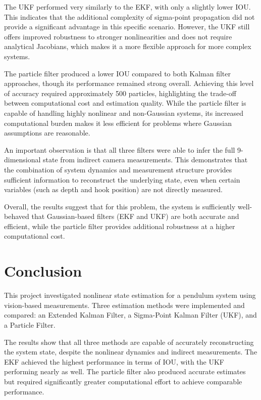 \documentclass[11pt, letterpaper, twocolumn]{article}
\begin{document}
The UKF performed very similarly to the EKF, with only a slightly lower IOU. This indicates
that the additional complexity of sigma-point propagation did not provide a significant advantage
in this specific scenario. However, the UKF still offers improved robustness to stronger nonlinearities
and does not require analytical Jacobians, which makes it a more flexible approach for more complex systems.

The particle filter produced a lower IOU compared to both Kalman filter approaches, though its 
performance remained strong overall. Achieving this level of accuracy required approximately 500 
particles, highlighting the trade-off between computational cost and estimation quality. While the 
particle filter is capable of handling highly nonlinear and non-Gaussian systems, its increased 
computational burden makes it less efficient for problems where Gaussian assumptions are reasonable.

An important observation is that all three filters were able to infer the full 9-dimensional state 
from indirect camera measurements. This demonstrates that the combination of system dynamics and 
measurement structure provides sufficient information to reconstruct the underlying state, even when 
certain variables (such as depth and hook position) are not directly measured.

Overall, the results suggest that for this problem, the system is sufficiently well-behaved that 
Gaussian-based filters (EKF and UKF) are both accurate and efficient, while the particle filter 
provides additional robustness at a higher computational cost.

\section*{Conclusion}

This project investigated nonlinear state estimation for a pendulum system using vision-based measurements. 
Three estimation methods were implemented and compared: an Extended Kalman Filter, a Sigma-Point Kalman 
Filter (UKF), and a Particle Filter.

The results show that all three methods are capable of accurately reconstructing the system state, 
despite the nonlinear dynamics and indirect measurements. The EKF achieved the highest performance in 
terms of IOU, with the UKF performing nearly as well. The particle filter also produced accurate estimates 
but required significantly greater computational effort to achieve comparable performance.
\end{document}
